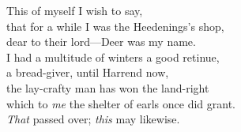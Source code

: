 \bvb This of myself I wish to say, \\
that for a while I was the Heedenings’s shop, \\
dear to their lord—Deer was my name. \\
I had a multitude of winters a good retinue, \\
a  bread-giver, until Harrend now, \\
the lay-crafty man has won the land-right \\
which to \emph{me} the shelter of earls once did grant. \\
\emph{That} passed over; \emph{this} may likewise.\evb\evg

\sectionline
